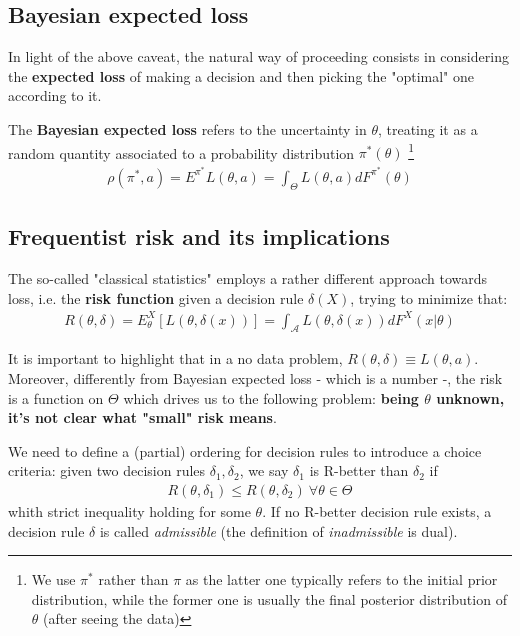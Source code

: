 \documentclass{article}
\newcommand{\loss}{L(\theta, a)}
\newcommand{\lossRule}{L(\theta, \delta(x))}
\newcommand{\risk}{R(\theta, \delta)}
\begin{document}
	\subsection{Bayesian expected loss}
	In light of the above caveat, the natural way of proceeding consists in considering the \textbf{expected loss} of making a decision and then picking the "optimal" one according to it.
	
	The \textbf{Bayesian expected loss} refers to the uncertainty in $\theta$, treating it as a random quantity associated to a probability distribution $\pi^*(\theta)$ \footnote{We use $\pi^*$ rather than $\pi$ as the latter one typically refers to the initial prior distribution, while the former one is usually the final posterior distribution of $\theta$ (after seeing the data)} 
	\begin{align*}
		\rho(\pi^*, a) = E^{\pi^*} \loss = \int_{\Theta} \loss dF^{\pi^*}(\theta)
	\end{align*}
    
	\subsection{Frequentist risk and its implications}
	The so-called "classical statistics" employs a rather different approach towards loss, i.e. the \textbf{risk function} given a decision rule $\delta(X)$, trying to minimize that:
	\begin{align*}
		\risk = E_{\theta}^{X}[\lossRule] = \int_{\mathcal{A}} \lossRule dF^X (x | \theta) 
	\end{align*}

	It is important to highlight that in a no data problem, $\risk \equiv \loss$. Moreover, differently from Bayesian expected loss - which is a number -, the risk is a function on $\Theta$ which drives us to the following problem: \textbf{being $\theta$ unknown, it's not clear what "small" risk means}.
	
	We need to define a (partial) ordering for decision rules to introduce a choice criteria: given two decision rules $\delta_1, \delta_2$, we say $\delta_1$ is R-better than $\delta_2$ if 
	\begin{align*}
		R(\theta, \delta_1) \leq R(\theta, \delta_2) \ \forall \theta \in \Theta
	\end{align*}
	 whith strict inequality holding for some $\theta$. If no R-better decision rule exists, a decision rule $\delta$ is called \textit{admissible} (the definition of \textit{inadmissible} is dual).
	
\end{document}
